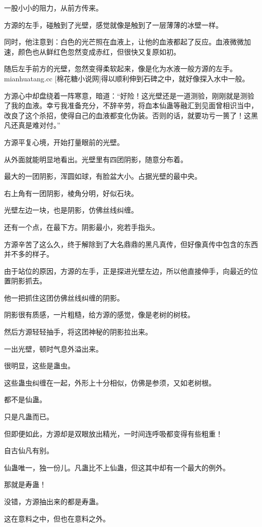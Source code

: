 \begin{this_body}
一股小小的阻力，从前方传来。

方源的左手，碰触到了光壁，感觉就像是触到了一层薄薄的冰壁一样。

同时，他注意到：白色的光芒照在血液上，让他的血液都起了反应。血液微微加速，颜色也从鲜红色忽然变成赤红，但很快又复原如初。

随后左手前方的光壁，忽然变得柔软起来，像是化为水液一般方源的左手。mianhuatang.cc [棉花糖小说网]得以顺利伸到石碑之中，就好像探入水中一般。

方源心中却盘绕着一阵寒意，暗道：“好险！这光壁还是一道测验，刚刚就是测验了我的血液。幸亏我准备充分，不辞辛劳，将血本仙蛊等融汇到见面曾相识当中，改良了这个杀招，使得自己的血液都变化伪装。否则的话，就要功亏一篑了！这黑凡还真是难对付。”

方源平复心境，开始打量眼前的光壁。

从外面就能明显地看出。光壁里有四团阴影，随意分布着。

最大的一团阴影，浑圆如球，有脸盆大小。占据光壁的最中央。

右上角有一团阴影，棱角分明，好似石块。

光壁左边一块，也是阴影，仿佛丝线纠缠。

还有一个点，在最下方。阴影最小，宛若手指头。

方源辛苦了这么久，终于解除到了大名鼎鼎的黑凡真传，但好像真传中包含的东西并不多的样子。

由于站位的原因，方源的左手，正是探进光壁左边，所以他直接伸手，向最近的位置阴影抓去。

他一把抓住这团仿佛丝线纠缠的阴影。

阴影很有质感，一片粗糙，给方源的感觉，像是老树的树枝。

然后方源轻轻抽手，将这团神秘的阴影拉出来。

一出光壁，顿时气息外溢出来。

很明显，这些是蛊虫。

这些蛊虫纠缠在一起，外形上十分相似，仿佛是参须，又如老树根。

都不是仙蛊。

只是凡蛊而已。

但即便如此，方源却是双眼放出精光，一时间连呼吸都变得有些粗重！

自古仙凡有别。

仙蛊唯一，独一份儿。凡蛊比不上仙蛊，但这其中却有一个最大的例外。

那就是寿蛊！

没错，方源抽出来的都是寿蛊。

这在意料之中，但也在意料之外。


\end{this_body}

